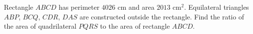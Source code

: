 Rectangle $ABCD$ has perimeter $4026$ cm and area $2013$ cm$^2$. Equilateral triangles $ABP$, $BCQ$, $CDR$, $DAS$ are constructed outside the rectangle. Find the ratio of the area of quadrilateral $PQRS$ to the area of rectangle $ABCD$.
